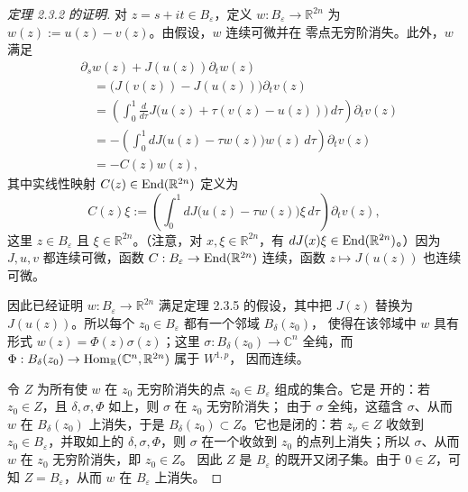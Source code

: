 \begin{proof}[定理 2.3.2 的证明]
对 $z=s+it\in B_\varepsilon$，定义
$w:B_\varepsilon\to\mathbb R^{2n}$ 为 $w(z):=u(z)-v(z)$。由假设，$w$ 连续可微并在
零点无穷阶消失。此外，$w$ 满足
\begin{align*}
  &\partial_sw(z)+J(u(z))\partial_tw(z)\\
  &\quad=\bigl(J(v(z))-J(u(z))\bigr)\partial_tv(z)\\
  &\quad=\left(\int_0^1\frac{d}{d\tau}
    J\bigl(u(z)+\tau(v(z)-u(z))\bigr)\,d\tau\right)\partial_tv(z)\\
  &\quad=-\left(\int_0^1dJ\bigl(u(z)-\tau w(z)\bigr)w(z)\,d\tau\right)
    \partial_tv(z)\\
  &\quad=-C(z)w(z),
\end{align*}
其中实线性映射 $C(z)\in\operatorname{End}(\mathbb R^{2n})$ 定义为
\[
  C(z)\xi:=
  \left(\int_0^1dJ\bigl(u(z)-\tau w(z)\bigr)\xi\,d\tau\right)\partial_tv(z),
\]
这里 $z\in B_\varepsilon$ 且 $\xi\in\mathbb R^{2n}$。（注意，对
$x,\xi\in\mathbb R^{2n}$，有 $dJ(x)\xi\in\operatorname{End}(\mathbb R^{2n})$。）因为 $J,u,v$
都连续可微，函数 $C:B_\varepsilon\to\operatorname{End}(\mathbb R^{2n})$ 连续，函数
$z\mapsto J(u(z))$ 也连续可微。

因此已经证明 $w:B_\varepsilon\to\mathbb R^{2n}$ 满足定理 2.3.5 的假设，其中把 $J(z)$
替换为 $J(u(z))$。所以每个 $z_0\in B_\varepsilon$ 都有一个邻域 $B_\delta(z_0)$，
使得在该邻域中 $w$ 具有形式 $w(z)=\Phi(z)\sigma(z)$；这里
$\sigma:B_\delta(z_0)\to\mathbb C^n$ 全纯，而
$\Phi:B_\delta(z_0)\to\operatorname{Hom}_{\mathbb R}(\mathbb C^n,\mathbb R^{2n})$ 属于 $W^{1,p}$，
因而连续。

令 $Z$ 为所有使 $w$ 在 $z_0$ 无穷阶消失的点 $z_0\in B_\varepsilon$ 组成的集合。它是
开的：若 $z_0\in Z$，且 $\delta,\sigma,\Phi$ 如上，则 $\sigma$ 在 $z_0$ 无穷阶消失；
由于 $\sigma$ 全纯，这蕴含 $\sigma$、从而 $w$ 在 $B_\delta(z_0)$ 上消失，于是
$B_\delta(z_0)\subset Z$。它也是闭的：若 $z_\nu\in Z$ 收敛到
$z_0\in B_\varepsilon$，并取如上的 $\delta,\sigma,\Phi$，则 $\sigma$ 在一个收敛到
$z_0$ 的点列上消失；所以 $\sigma$、从而 $w$ 在 $z_0$ 无穷阶消失，即 $z_0\in Z$。
因此 $Z$ 是 $B_\varepsilon$ 的既开又闭子集。由于 $0\in Z$，可知
$Z=B_\varepsilon$，从而 $w$ 在 $B_\varepsilon$ 上消失。
\end{proof}

